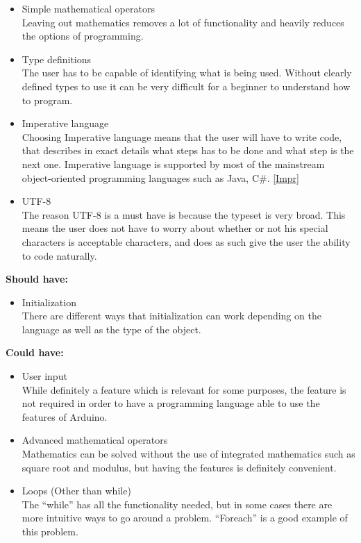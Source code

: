 \begin{itemize}
\item Simple mathematical operators \\
Leaving out mathematics removes a lot of functionality and heavily reduces the options of programming. \\

\item Type definitions \\
The user has to be capable of identifying what is being used. Without clearly defined types to use it can be very difficult for a beginner to understand how to program. \\

\item Imperative language \\
Choosing Imperative language means that the user will have to write code, that describes in exact details what steps has to be done and what step is the next one. Imperative language is supported by most of the mainstream object-oriented programming languages such as Java, C\#. \ref{Impr}

\item UTF-8 \\
The reason UTF-8 is a must have is because the typeset is very broad. This means the user does not have to worry about whether or not his special characters is acceptable characters, and does as such give the user the ability to code naturally.\\
\end{itemize}

\textbf{Should have:}
\begin{itemize}
\item Initialization \\
There are different ways that initialization can work depending on the language as well as the type of the object. \\
\end{itemize}

\textbf{Could have:}
\begin{itemize}
\item User input \\
While definitely a feature which is relevant for some purposes, the feature is not required in order to have a programming language able to use the features of Arduino. \\

\item Advanced mathematical operators \\
Mathematics can be solved without the use of integrated mathematics such as square root and modulus, but having the features is definitely convenient. \\

\item Loops (Other than while) \\
The ``while'' has all the functionality needed, but in some cases there are more intuitive ways to go around a problem. ``Foreach'' is a good example of this problem.\\
\end{itemize}